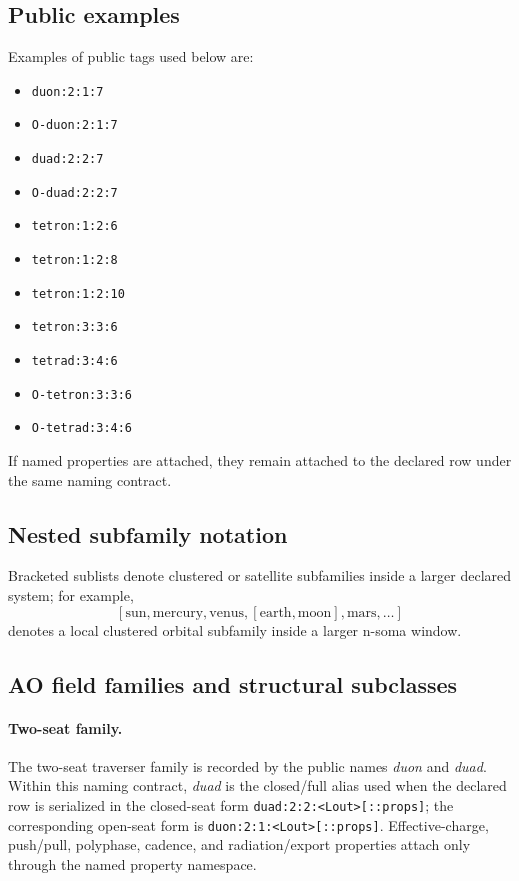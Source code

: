 \subsection{Public examples}
Examples of public tags used below are:
\begin{itemize}[leftmargin=1.5em]
  \item \texttt{duon:2:1:7}
  \item \texttt{O-duon:2:1:7}
  \item \texttt{duad:2:2:7}
  \item \texttt{O-duad:2:2:7}
  \item \texttt{tetron:1:2:6}
  \item \texttt{tetron:1:2:8}
  \item \texttt{tetron:1:2:10}
  \item \texttt{tetron:3:3:6}
  \item \texttt{tetrad:3:4:6}
  \item \texttt{O-tetron:3:3:6}
  \item \texttt{O-tetrad:3:4:6}
\end{itemize}
If named properties are attached, they remain attached to the declared row under the same naming contract.

\subsection{Nested subfamily notation}
Bracketed sublists denote clustered or satellite subfamilies inside a larger declared system; for example,
\[
[\mathrm{sun},\mathrm{mercury},\mathrm{venus},[\mathrm{earth},\mathrm{moon}],\mathrm{mars},\dots]
\]
denotes a local clustered orbital subfamily inside a larger n-soma window.

\subsection{AO field families and structural subclasses}
\paragraph{Two-seat family.} The two-seat traverser family is recorded by the public names \emph{duon} and \emph{duad}. Within this naming contract, \emph{duad} is the closed/full alias used when the declared row is serialized in the closed-seat form \texttt{duad:2:2:<Lout>[::props]}; the corresponding open-seat form is \texttt{duon:2:1:<Lout>[::props]}. Effective-charge, push/pull, polyphase, cadence, and radiation/export properties attach only through the named property namespace.

